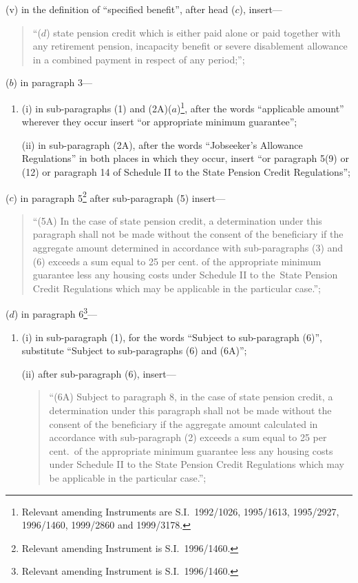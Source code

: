 \documentclass[12pt,a4paper]{article}
\begin{document}
\begin{enumerate}
\begin{enumerate}
(v) in the definition of “specified benefit”, after head ($c$), insert—
\begin{quotation}
“($d$) state pension credit which is either paid alone or paid together with any retirement pension, incapacity benefit or severe disablement allowance in a combined payment in respect of any period;”;
\end{quotation}
\end{enumerate}

($b$) in paragraph 3—
\begin{enumerate}\item[]
(i) in sub-paragraphs (1) and (2A)($a$)\footnote{Relevant amending Instruments are S.I.\ 1992/1026, 1995/1613, 1995/2927, 1996/1460, 1999/2860 and 1999/3178.}, after the words “applicable amount” wherever they occur insert “or appropriate minimum guarantee”;

(ii) in sub-paragraph (2A), after the words “Jobseeker’s Allowance Regulations” in both places in which they occur, insert “or paragraph 5(9) or (12) or paragraph 14 of Schedule II to the State Pension Credit Regulations”;
\end{enumerate}

($c$) in paragraph 5\footnote{Relevant amending Instrument is S.I.\ 1996/1460.} after sub-paragraph (5) insert—
\begin{quotation}
“(5A) In the case of state pension credit, a determination under this paragraph shall not be made without the consent of the beneficiary if the aggregate amount determined in accordance with sub-paragraphs (3) and (6) exceeds a sum equal to 25 per cent. of the appropriate minimum guarantee less any housing costs under Schedule II to the\ State Pension Credit Regulations which may be applicable in the particular case.”;
\end{quotation}

($d$) in paragraph 6\footnote{Relevant amending Instrument is S.I.\ 1996/1460.}—
\begin{enumerate}\item[]
(i) in sub-paragraph (1), for the words “Subject to sub-paragraph (6)”, substitute “Subject to sub-paragraphs (6) and (6A)”;

(ii) after sub-paragraph (6), insert—
\begin{quotation}
“(6A) Subject to paragraph 8, in the case of state pension credit, a determination under this paragraph shall not be made without the consent of the beneficiary if the aggregate amount calculated in accordance with sub-paragraph (2) exceeds a sum equal to 25 per cent.\ of the appropriate minimum guarantee less any housing costs under Schedule II to the State Pension Credit Regulations which may be applicable in the particular case.”;
\end{quotation}
\end{enumerate}


\end{enumerate}
\end{document}
